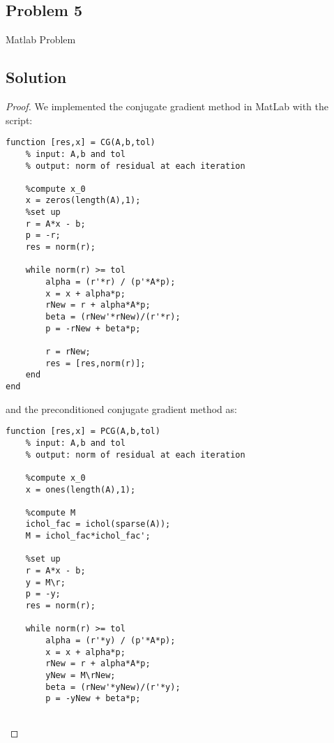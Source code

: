 \documentclass[12pt]{report}
\begin{document}
\begin{problem}%
\subsection*{Problem 5}

Matlab Problem

\subsection*{Solution}
\begin{proof}

We implemented the conjugate gradient method in MatLab with the script:
\begin{lstlisting}[style=Matlab-editor]
function [res,x] = CG(A,b,tol)
    % input: A,b and tol
    % output: norm of residual at each iteration
    
    %compute x_0
    x = zeros(length(A),1);
    %set up
    r = A*x - b;
    p = -r;
    res = norm(r);
    
    while norm(r) >= tol
        alpha = (r'*r) / (p'*A*p);
        x = x + alpha*p;
        rNew = r + alpha*A*p;
        beta = (rNew'*rNew)/(r'*r);
        p = -rNew + beta*p;
        
        r = rNew;
        res = [res,norm(r)];
    end
end
\end{lstlisting}
and the preconditioned conjugate gradient method as:
\begin{lstlisting}[style=Matlab-editor]
function [res,x] = PCG(A,b,tol)
    % input: A,b and tol
    % output: norm of residual at each iteration
    
    %compute x_0
    x = ones(length(A),1);
    
    %compute M
    ichol_fac = ichol(sparse(A));
    M = ichol_fac*ichol_fac';

    %set up
    r = A*x - b;
    y = M\r;
    p = -y;
    res = norm(r);
    
    while norm(r) >= tol
        alpha = (r'*y) / (p'*A*p);
        x = x + alpha*p;
        rNew = r + alpha*A*p;
        yNew = M\rNew;
        beta = (rNew'*yNew)/(r'*y);
        p = -yNew + beta*p;
        

\end{lstlisting}
\end{proof}
\end{problem}
\end{document}
